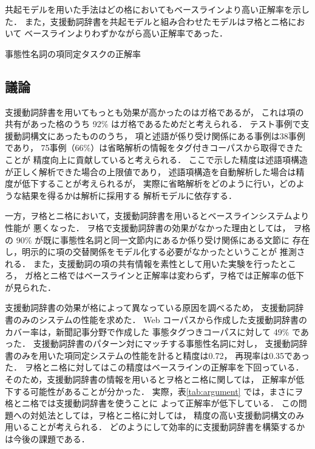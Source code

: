 \documentclass[japanese]{jnlp_1.4}
\begin{document}
共起モデルを用いた手法はどの格においてもベースラインより高い正解率を示した．
また，支援動詞辞書を共起モデルと組み合わせたモデルはヲ格とニ格において
ベースラインよりわずかながら高い正解率であった．

\begin{table}[t]
    \caption{事態性名詞の項同定タスクの正解率}
    \label{tab:argument}

\end{table}


\subsection{議論}

支援動詞辞書を用いてもっとも効果が高かったのはガ格であるが，
これは項の共有があった格のうち 92\% はガ格であるためだと考えられる．
テスト事例で支援動詞構文にあったもののうち，
項と述語が係り受け関係にある事例は38事例であり，
75事例（66\%）は省略解析の情報をタグ付きコーパスから取得できたことが
精度向上に貢献していると考えられる．
ここで示した精度は述語項構造が正しく解析できた場合の上限値であり，
述語項構造を自動解析した場合は精度が低下することが考えられるが，
実際に省略解析をどのように行い，どのような結果を得るかは解析に採用する
解析モデルに依存する．

一方，ヲ格とニ格において，支援動詞辞書を用いるとベースラインシステムより性能が
悪くなった．
ヲ格で支援動詞辞書の効果がなかった理由としては，
ヲ格の 90\% が既に事態性名詞と同一文節内にあるか係り受け関係にある文節に
存在し，明示的に項の交替関係をモデル化する必要がなかったということが
推測される．
また，支援動詞の項の共有情報を素性として用いた実験を行ったところ，
ガ格とニ格ではベースラインと正解率は変わらず，ヲ格では正解率の低下が見られた．

支援動詞辞書の効果が格によって異なっている原因を調べるため，
支援動詞辞書のみのシステムの性能を求めた．
Web コーパスから作成した支援動詞辞書のカバー率は，新聞記事分野で作成した
事態タグつきコーパスに対して 49\% であった．
支援動詞辞書のパターン対にマッチする事態性名詞に対し，
支援動詞辞書のみを用いた項同定システムの性能を計ると精度は0.72，
再現率は0.35であった．
ヲ格とニ格に対してはこの精度はベースラインの正解率を下回っている．
そのため，支援動詞辞書の情報を用いるとヲ格とニ格に関しては，
正解率が低下する可能性があることが分かった．
実際，表\ref{tab:argument} では，まさにヲ格とニ格では支援動詞辞書を使うことに
よって正解率が低下している．
この問題への対処法としては，ヲ格とニ格に対しては，
精度の高い支援動詞構文のみ用いることが考えられる．
どのようにして効率的に支援動詞辞書を構築するかは今後の課題である．
\end{document}
